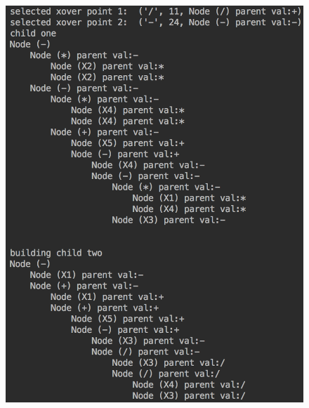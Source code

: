 \documentclass[11pt]{article}
\begin{document}
\begin{figure}[h]
\includegraphics[scale = .60]{3}
\end{figure}

\newpage
\end{document}

